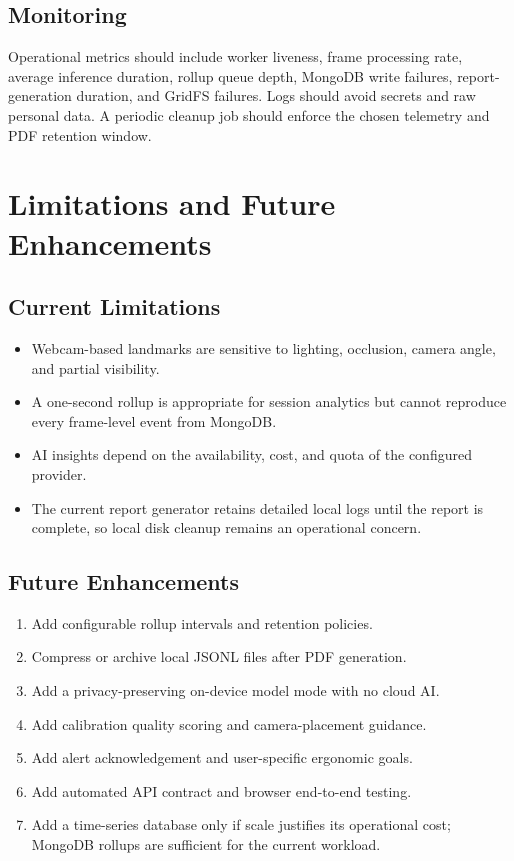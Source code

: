 \documentclass[12pt,a4paper]{report}
\begin{document}
\section{Monitoring}
Operational metrics should include worker liveness, frame processing rate,
average inference duration, rollup queue depth, MongoDB write failures,
report-generation duration, and GridFS failures. Logs should avoid secrets and
raw personal data. A periodic cleanup job should enforce the chosen telemetry
and PDF retention window.

\chapter{Limitations and Future Enhancements}
\section{Current Limitations}
\begin{itemize}
    \item Webcam-based landmarks are sensitive to lighting, occlusion, camera
    angle, and partial visibility.
    \item A one-second rollup is appropriate for session analytics but cannot
    reproduce every frame-level event from MongoDB.
    \item AI insights depend on the availability, cost, and quota of the
    configured provider.
    \item The current report generator retains detailed local logs until the
    report is complete, so local disk cleanup remains an operational concern.
\end{itemize}

\section{Future Enhancements}
\begin{enumerate}
    \item Add configurable rollup intervals and retention policies.
    \item Compress or archive local JSONL files after PDF generation.
    \item Add a privacy-preserving on-device model mode with no cloud AI.
    \item Add calibration quality scoring and camera-placement guidance.
    \item Add alert acknowledgement and user-specific ergonomic goals.
    \item Add automated API contract and browser end-to-end testing.
    \item Add a time-series database only if scale justifies its operational
    cost; MongoDB rollups are sufficient for the current workload.
\end{enumerate}
\end{document}
